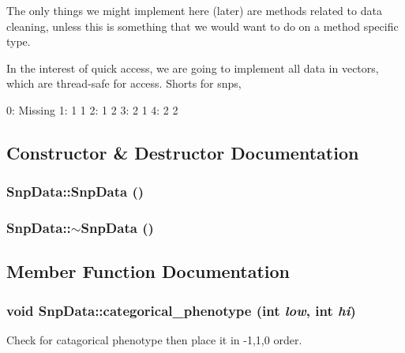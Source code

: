 The only things we might implement here (later) are methods related to data cleaning, unless this is something that we would want to do on a method specific type.

In the interest of quick access, we are going to implement all data in vectors, which are thread-\/safe for access. Shorts for snps,

0: Missing 1: 1 1 2: 1 2 3: 2 1 4: 2 2 

\subsection{Constructor \& Destructor Documentation}
\hypertarget{classSnpData_a67ecd2aa4fd9d991117724c025d4fe8b}{
\subsubsection[{SnpData}]{\setlength{\rightskip}{0pt plus 5cm}SnpData::SnpData ()}}
\label{classSnpData_a67ecd2aa4fd9d991117724c025d4fe8b}
\hypertarget{classSnpData_ae8f5c2288be6040daaeacf2a00a6cc5e}{
\subsubsection[{$\sim$SnpData}]{\setlength{\rightskip}{0pt plus 5cm}SnpData::$\sim$SnpData ()}}
\label{classSnpData_ae8f5c2288be6040daaeacf2a00a6cc5e}


\subsection{Member Function Documentation}
\hypertarget{classSnpData_a5f986138c94a1a0491bd56f5d0b9eb14}{
\subsubsection[{categorical\_\-phenotype}]{\setlength{\rightskip}{0pt plus 5cm}void SnpData::categorical\_\-phenotype (int {\em low}, \/  int {\em hi})}}
\label{classSnpData_a5f986138c94a1a0491bd56f5d0b9eb14}
Check for catagorical phenotype then place it in -\/1,1,0 order.

